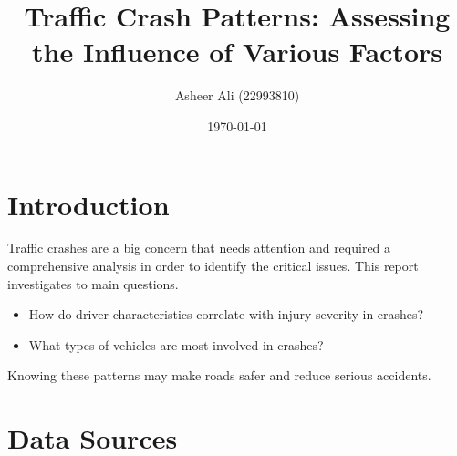 \documentclass[a4paper,10pt]{article}
\title{Traffic Crash Patterns: Assessing the Influence of Various Factors}
\author{Asheer Ali (22993810)}
\date{\today}
\begin{document}
	\maketitle
	
	\section{Introduction}
    Traffic crashes are a big concern that needs attention and required a comprehensive analysis in order to identify the critical issues. This report investigates to main questions. 
		\begin{itemize}
			\item How do driver characteristics correlate with injury severity in crashes?
			\item What types of vehicles are most involved in crashes?	\end{itemize}
	
    Knowing these patterns may make roads safer and reduce serious accidents.
    
\section{Data Sources}
\end{document}
